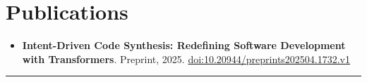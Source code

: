 \documentclass[10pt, letterpaper]{article}
\begin{document}
\vspace{0.08cm}
\section{Publications}
\begin{itemize}[leftmargin=*]
  \item \textbf{Intent-Driven Code Synthesis: Redefining Software Development with Transformers}. Preprint, 2025. \href{https://doi.org/10.20944/preprints202504.1732.v1}{doi:10.20944/preprints202504.1732.v1}
\end{itemize}


\vspace{0.05cm}
\noindent\textcolor{myAccent}{\rule{\textwidth}{0.0pt}}
\end{document}
